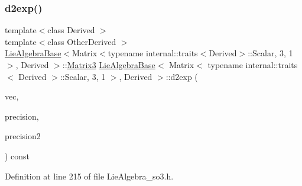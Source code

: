 \subsubsection{\texorpdfstring{d2exp()}{d2exp()}\hspace{0.1cm}{\footnotesize\ttfamily [2/2]}}
{\footnotesize\ttfamily template$<$class Derived $>$ \\
template$<$class Other\+Derived $>$ \\
\hyperlink{class_lie_algebra_base}{Lie\+Algebra\+Base}$<$Matrix$<$typename internal\+::traits$<$Derived$>$\+::Scalar, 3, 1$>$, Derived $>$\+::\hyperlink{class_lie_algebra_base_3_01_matrix_3_01typename_01internal_1_1traits_3_01_derived_01_4_1_1_scalabfa0bdce6d9781ee940346c3f6d91f4e_a76b0bda7b6a5390a434df96474c582db}{Matrix3} \hyperlink{class_lie_algebra_base}{Lie\+Algebra\+Base}$<$ Matrix$<$ typename internal\+::traits$<$ Derived $>$\+::Scalar, 3, 1 $>$, Derived $>$\+::d2exp (\begin{DoxyParamCaption}\item[{const Matrix\+Base$<$ Other\+Derived $>$ \&}]{vec,  }\item[{Scalar}]{precision,  }\item[{Scalar}]{precision2 }\end{DoxyParamCaption}) const\hspace{0.3cm}{\ttfamily [inline]}}



Definition at line 215 of file Lie\+Algebra\+\_\+so3.\+h.

\hypertarget{class_lie_algebra_base_3_01_matrix_3_01typename_01internal_1_1traits_3_01_derived_01_4_1_1_scalabfa0bdce6d9781ee940346c3f6d91f4e_a8b415ebfce966f09b845e7094bc4779b}{}\label{class_lie_algebra_base_3_01_matrix_3_01typename_01internal_1_1traits_3_01_derived_01_4_1_1_scalabfa0bdce6d9781ee940346c3f6d91f4e_a8b415ebfce966f09b845e7094bc4779b} 
